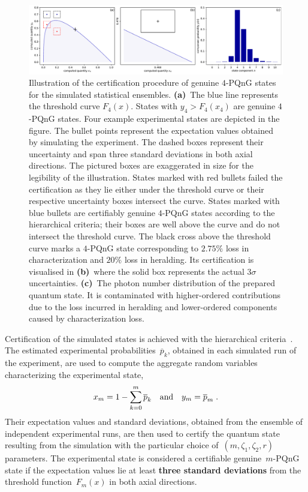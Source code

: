 \documentclass{article}
\begin{document}
\begin{figure}[h]
  \bgroup
    \hspace*{-0.125\columnwidth}%
    \includegraphics[width = 1.25 \columnwidth]{import/illustrate_process.pdf}
  \egroup
  \caption{
    Illustration of the certification procedure of genuine $4$-PQnG states for the simulated statistical ensembles. \textbf{(a)}~The blue line represents the threshold curve $F_{4} (x)$. States with $y_{4} > F_{4}(x_{4})$ are genuine $4$-PQnG states. Four example experimental states are depicted in the figure. The bullet points represent the expectation values obtained by simulating the experiment. The dashed boxes represent their uncertainty and span three standard deviations in both axial directions. The pictured boxes are exaggerated in size for the legibility of the illustration. States marked with red bullets failed the certification as they lie either under the threshold curve or their respective uncertainty boxes intersect the curve. States marked with blue bullets are certifiably genuine $4$-PQnG states according to the hierarchical criteria; their boxes are well above the curve and do not intersect the threshold curve. The black cross above the threshold curve marks a $4$-PQnG state corresponding to
    $2.75\%$ loss in characterization and $20\%$ loss in heralding. Its certification is visualised in \textbf{(b)}~where the solid box represents the actual $3 \sigma$ uncertainties. \textbf{(c)}~The photon number distribution of the prepared quantum state. It is contaminated with higher-ordered contributions due to the loss incurred in heralding and lower-ordered components caused by characterization loss.
  }
  \label{f-il}
\end{figure}

Certification of the simulated states is achieved with the hierarchical criteria~\cite{lachman2019}. The estimated experimental probabilities~$\overline{p}_{k}$, obtained in each simulated run of the experiment, are used to compute the aggregate random variables characterizing the experimental state,
%
\begin{equation}
  x_{m} = 1 - \sum_{k = 0}^{m} \overline{p}_{k} 
  \quad\text{and}\quad
  y_{m} = \overline{p}_{m} 
  \;\text{.}
\end{equation}
%
Their expectation values and standard deviations, obtained from the ensemble of independent experimental runs, are then used to certify the quantum state resulting from the simulation with the particular choice of~${(m, \zeta_{1}, \zeta_{2}, r)}$ parameters. The experimental state is considered a certifiable genuine~$m$-PQnG state if the expectation values lie at least \textbf{three standard deviations} from the threshold function~$F_{m} (x)$ in both axial directions.
\end{document}
